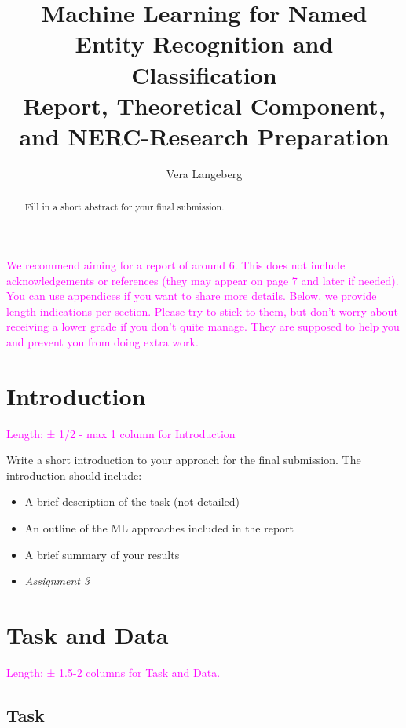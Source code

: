 \documentclass[11pt]{article}
\title{Machine Learning for Named Entity Recognition and Classification\\ Report, Theoretical Component, and NERC-Research Preparation}
\author{Vera Langeberg}
\begin{document}
\maketitle
\begin{abstract}
    Fill in a short abstract for your final submission.

\end{abstract}


\textcolor{magenta}{We recommend aiming for a report of around 6. This does not include acknowledgements or references (they may appear on page 7 and later if needed). You can use appendices if you want to share more details. Below, we provide length indications per section. Please try to stick to them, but don't worry about receiving a lower grade if you don't quite manage. They are supposed to help you and prevent you from doing extra work.}

\section{Introduction}

\textcolor{magenta}{Length: ±  1/2 - max 1 column for Introduction}


Write a short introduction to your approach for the final submission. The introduction should include:

\begin{itemize}
    \item A brief description of the task (not detailed)
    \item An outline of the ML approaches included in the report
    \item A brief summary of your results
\end{itemize}

\begin{itemize}
    \item[] \textit{Assignment 3}
\end{itemize}



\section{Task and Data}

\textcolor{magenta}{Length: ± 1.5-2 columns for Task and Data.}


\subsection{Task}
\end{document}
